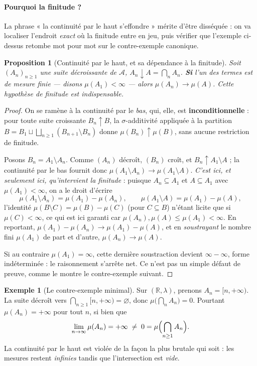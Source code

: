 \documentclass[11pt,a4paper]{article}
\theoremstyle{plain}
\newtheorem{proposition}{Proposition}
\theoremstyle{definition}
\newtheorem{exemple}{Exemple}
\newcommand{\R}{\mathbb{R}}
\newcommand{\A}{\mathcal{A}}
\newcommand{\1}{\mathbf{1}}
\begin{document}
\paragraph{Pourquoi la finitude ?} La phrase « la continuité par le haut
s'effondre » mérite d'être disséquée : on va localiser l'endroit \emph{exact} où la
finitude entre en jeu, puis vérifier que l'exemple ci-dessus retombe mot pour mot
sur le contre-exemple canonique.

\begin{proposition}[Continuité par le haut, et sa dépendance à la finitude]
\label{prop:contHaut}
Soit $(A_n)_{n\ge1}$ une suite \emph{décroissante} de $\A$, $A_n\downarrow A
=\bigcap_n A_n$. \textbf{Si} l'un des termes est de mesure finie --- disons
$\mu(A_1)<\infty$ --- alors $\mu(A_n)\to\mu(A)$. Cette hypothèse de finitude est
indispensable.
\end{proposition}

\begin{proof}
On se ramène à la continuité par le \emph{bas}, qui, elle, est
\textbf{inconditionnelle} : pour toute suite croissante $B_n\uparrow B$, la
$\sigma$-additivité appliquée à la partition
$B=B_1\sqcup\bigsqcup_{n\ge1}(B_{n+1}\setminus B_n)$ donne
$\mu(B_n)\uparrow\mu(B)$, sans aucune restriction de finitude.

Posons $B_n=A_1\setminus A_n$. Comme $(A_n)$ décroît, $(B_n)$ croît, et
$B_n\uparrow A_1\setminus A$ ; la continuité par le bas fournit donc
$\mu(A_1\setminus A_n)\to\mu(A_1\setminus A)$. \emph{C'est ici, et seulement ici,
qu'intervient la finitude} : puisque $A_n\subseteq A_1$ et $A\subseteq A_1$ avec
$\mu(A_1)<\infty$, on a le droit d'écrire
\[
  \mu(A_1\setminus A_n)=\mu(A_1)-\mu(A_n),\qquad
  \mu(A_1\setminus A)=\mu(A_1)-\mu(A),
\]
l'identité $\mu(B\setminus C)=\mu(B)-\mu(C)$ (pour $C\subseteq B$) n'étant licite
que si $\mu(C)<\infty$, ce qui est ici garanti car $\mu(A_n),\mu(A)\le\mu(A_1)
<\infty$. En reportant, $\mu(A_1)-\mu(A_n)\to\mu(A_1)-\mu(A)$, et en
\emph{soustrayant} le nombre fini $\mu(A_1)$ de part et d'autre, $\mu(A_n)\to\mu(A)$.

Si au contraire $\mu(A_1)=\infty$, cette dernière soustraction devient
$\infty-\infty$, forme indéterminée : le raisonnement s'arrête net. Ce n'est pas un
simple défaut de preuve, comme le montre le contre-exemple suivant.
\end{proof}

\begin{exemple}[Le contre-exemple minimal]\label{ex:minimal}
Sur $(\R,\lambda)$, prenons $A_n=[n,+\infty)$. La suite décroît vers
$\bigcap_{n\ge1}[n,+\infty)=\varnothing$, donc
$\mu\bigl(\bigcap_n A_n\bigr)=0$. Pourtant $\mu(A_n)=+\infty$ pour tout $n$, si bien
que
\[
  \lim_{n\to\infty}\mu(A_n)=+\infty\;\ne\;0=\mu\Bigl(\bigcap_{n\ge1}A_n\Bigr).
\]
La continuité par le haut est violée de la façon la plus brutale qui soit : les
mesures restent \emph{infinies} tandis que l'intersection est \emph{vide}.
\end{exemple}
\end{document}
